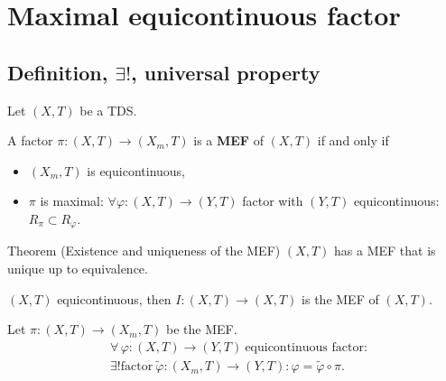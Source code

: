 \section{Maximal equicontinuous factor}
\subsection{Definition, $\exists!$, universal property}
\begin{frame}
  Let $(X,T)$ be a TDS.
  \begin{definition}
    A factor $\pi : (X,T) \to (X_m,T)$ is a \textbf{MEF} of $(X,T)$ if and only if
  \begin{itemize}
    \item $(X_m,T)$ is equicontinuous,
    \item $\pi$ is maximal: $\forall \varphi : (X,T) \to (Y,T)$ factor with $(Y,T)$ equicontinuous: $R_\pi \subset R_\varphi$.
  \end{itemize}
\end{definition}
\pause
  \begin{alertblock}{Theorem (Existence and uniqueness of the MEF)}
  $(X,T)$ has a MEF that is unique up to equivalence.
  \end{alertblock}
  \pause
\begin{example}
  $(X,T)$ equicontinuous, then $I: (X,T) \to (X,T)$ is the MEF of $(X,T)$.
\end{example}

\end{frame}
\begin{frame}[fragile]
\begin{proposition}
  Let $\pi : (X, T) \to  (X_m,T)$ be the MEF.
  \begin{equation*}
    \begin{split}
      &\forall \, \varphi : (X,T) \to (Y,T) \ \text{equicontinuous factor}: \\
      & \exists! \text{factor} \ \tilde{\varphi}: (X_m,T) \to (Y,T): \varphi = \tilde{\varphi} \circ \pi.
    \end{split}
      \end{equation*}
  \end{proposition}
  \begin{center}
  \end{center}
\end{frame}
